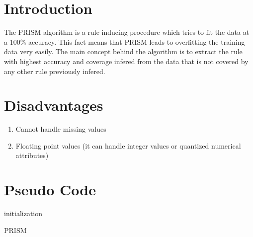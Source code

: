 \section{Introduction}

The PRISM\cite{cendrowska1987prism} algorithm is a rule inducing procedure which tries to fit the data at a 100\% accuracy. This fact means that PRISM leads to overfitting the training data very easily. The main concept behind the algorithm is to extract the rule with highest accuracy and coverage infered from the data that is not covered by any other rule previously infered.

\section{Disadvantages}

\begin{enumerate}
    \item Cannot handle missing values
    \item Floating point values (it can handle integer values or quantized numerical attributes)
\end{enumerate}

\section{Pseudo Code}

\begin{algorithm}[H]
\SetAlgoLined
    initialization\;
\caption{PRISM}
\end{algorithm}

